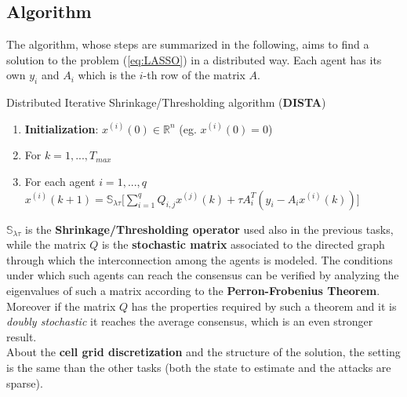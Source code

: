 \subsection*{Algorithm}
The algorithm, whose steps are summarized in the following, aims to find a solution to the problem (\ref{eq:LASSO}) in a distributed way. Each agent has its own $y_i$ and $A_i$ which is the $i$-th row of the matrix $A$.

\begin{algorithm}
    \caption{Distributed Iterative Shrinkage/Thresholding algorithm (\textbf{DISTA})}
    \begin{enumerate}
        \itemsep-0.3em
        \item \textbf{Initialization}: $x^{(i)}(0)\in \mathbb{R}^n$ (eg. $x^{(i)}(0)=0$) 
        \item For $k=1,..., T_{max}$
        \item For each agent $i=1,...,q \quad$ 
        $x^{(i)}(k+1) = \mathbb{S}_{\lambda\tau} 
            \bigg[ 
                \sum_{i=1}^q Q_{i,j}x^{(j)}(k) +
                \tau A_i^T(y_i-A_ix^{(i)}(k))
            \bigg]$
    \end{enumerate}
    \vspace{-0.4cm}
\end{algorithm}
\noindent
$\mathbb{S}_{\lambda\tau}$ is the \textbf{Shrinkage/Thresholding operator} used also in the previous tasks, while the matrix $Q$ is the \textbf{stochastic matrix} associated to the directed graph through which the interconnection among the agents is modeled. The conditions under which such agents can reach the consensus can be verified by analyzing the eigenvalues of such a matrix according to the \textbf{Perron-Frobenius Theorem}. Moreover if the matrix $Q$ has the properties required by such a theorem and it is \textit{doubly stochastic} it reaches the average consensus, which is an even stronger result.\\
About the \textbf{cell grid discretization} and the structure of the solution, the setting is the same than the other tasks (both the state to estimate and the attacks are sparse).
\vspace{-0.3cm}
